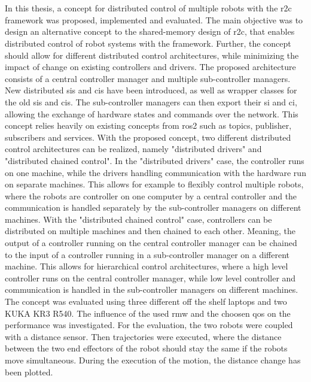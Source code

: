 \chapter{}
\label{sec:conclusion_and_outlook}
In  this thesis, a concept for distributed control of multiple robots with the \gls{r2c} framework was proposed, implemented and evaluated. The main objective was to design an alternative concept to the shared-memory design of \gls{r2c}, that enables distributed control of robot systems with the framework. Further, the concept should allow for different distributed control architectures, while minimizing the impact of change on existing controllers and drivers. \newline
The proposed architecture consists of a central controller manager and multiple sub-controller managers. New distributed \glspl{si} and \glspl{ci} have been introduced, as well as wrapper classes for the old \glspl{si} and \glspl{ci}. The sub-controller managers can then export their \gls{si} and \gls{ci}, allowing the exchange of hardware states and commands over the network. This concept relies heavily on existing concepts from \gls{ros2} such as topics, publisher, subscribers and services.\newline
With the proposed concept, two different distributed control architectures can be realized, namely "distributed drivers" and "distributed chained control". In the "distributed drivers" case, the controller runs on one machine, while the drivers handling communication with the hardware run on separate machines. This allows for example to flexibly control multiple robots, where the robots are controller on one computer by a central controller and the communication is handled separately by the sub-controller managers on different machines. With the "distributed chained control" case, controllers can be distributed on multiple machines and then chained to each other. Meaning, the output of a controller running on the central controller manager can be chained to the input of a controller running in a sub-controller manager on a different machine. This allows for hierarchical control architectures, where a high level controller runs on the central controller manager, while low level controller and communication is handled in the sub-controller managers on different machines.\newline
The concept was evaluated using three different off the shelf laptops and two KUKA KR3 R540. The influence of the used \gls{rmw} and the choosen \gls{qos} on the performance was investigated. For the evaluation, the two robots were coupled with a distance sensor. Then trajectories were executed, where the distance between the two end effectors of the robot should stay the same if the robots move simultaneous. During the execution of the motion, the distance change has been plotted.\newline
